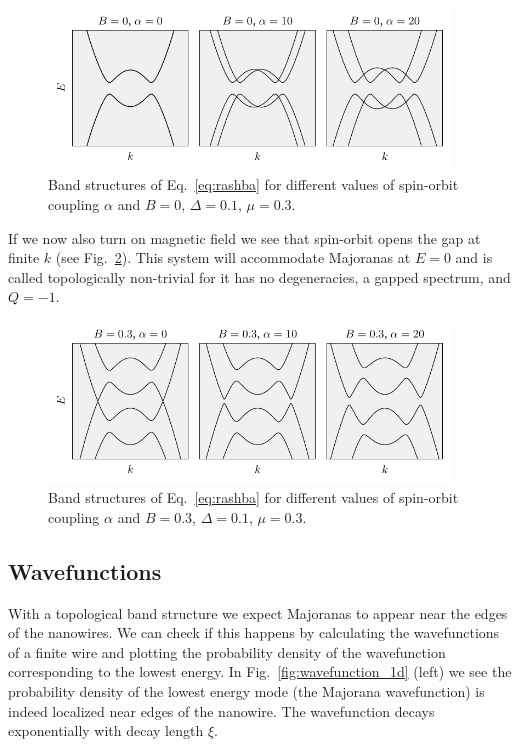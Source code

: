\begin{figure}
\centering{}\includegraphics[width=0.95\textwidth]{chapter_introduction/figures/SO_no_zeeman.pdf}
\caption{Band structures of Eq.~\ref{eq:rashba} for different values of spin-orbit coupling $\alpha$ and $B=0$, $\Delta=0.1$, $\mu=0.3$.
\label{fig:SO_no_zeeman}}
\end{figure}
If we now also turn on magnetic field we see that spin-orbit opens the gap at finite $k$ (see Fig.~\ref{fig:SO_and_zeeman}).
This system will accommodate Majoranas at $E=0$ and is called topologically non-trivial for it has no degeneracies, a gapped spectrum, and $Q=-1$.

\begin{figure}
\centering{}\includegraphics[width=0.95\textwidth]{chapter_introduction/figures/SO_and_zeeman.pdf}
\caption{Band structures of Eq.~\ref{eq:rashba} for different values of spin-orbit coupling $\alpha$ and $B=0.3$, $\Delta=0.1$, $\mu=0.3$.
\label{fig:SO_and_zeeman}}
\end{figure}


\subsection{Wavefunctions}

With a topological band structure we expect Majoranas to appear near
the edges of the nanowires.
We can check if this happens by calculating the wavefunctions of a finite wire and plotting the probability density of the wavefunction corresponding to the lowest energy.
In Fig.~\ref{fig:wavefunction_1d} (left) we see the probability density of the lowest energy mode (the Majorana wavefunction) is indeed localized near edges of the nanowire.
The wavefunction decays exponentially with decay length $\xi$.

